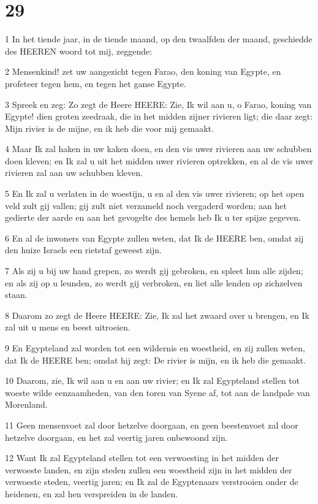 \chapter{29}

\par 1 In het tiende jaar, in de tiende maand, op den twaalfden der maand, geschiedde des HEEREN woord tot mij, zeggende:
\par 2 Mensenkind! zet uw aangezicht tegen Farao, den koning van Egypte, en profeteer tegen hem, en tegen het ganse Egypte.
\par 3 Spreek en zeg: Zo zegt de Heere HEERE: Zie, Ik wil aan u, o Farao, koning van Egypte! dien groten zeedraak, die in het midden zijner rivieren ligt; die daar zegt: Mijn rivier is de mijne, en ik heb die voor mij gemaakt.
\par 4 Maar Ik zal haken in uw kaken doen, en den vis uwer rivieren aan uw schubben doen kleven; en Ik zal u uit het midden uwer rivieren optrekken, en al de vis uwer rivieren zal aan uw schubben kleven.
\par 5 En Ik zal u verlaten in de woestijn, u en al den vis uwer rivieren; op het open veld zult gij vallen; gij zult niet verzameld noch vergaderd worden; aan het gedierte der aarde en aan het gevogelte des hemels heb Ik u ter spijze gegeven.
\par 6 En al de inwoners van Egypte zullen weten, dat Ik de HEERE ben, omdat zij den huize Israels een rietstaf geweest zijn.
\par 7 Als zij u bij uw hand grepen, zo werdt gij gebroken, en spleet hun alle zijden; en als zij op u leunden, zo werdt gij verbroken, en liet alle lenden op zichzelven staan.
\par 8 Daarom zo zegt de Heere HEERE: Zie, Ik zal het zwaard over u brengen, en Ik zal uit u mens en beest uitroeien.
\par 9 En Egypteland zal worden tot een wildernis en woestheid, en zij zullen weten, dat Ik de HEERE ben; omdat hij zegt: De rivier is mijn, en ik heb die gemaakt.
\par 10 Daarom, zie, Ik wil aan u en aan uw rivier; en Ik zal Egypteland stellen tot woeste wilde eenzaamheden, van den toren van Syene af, tot aan de landpale van Morenland.
\par 11 Geen mensenvoet zal door hetzelve doorgaan, en geen beestenvoet zal door hetzelve doorgaan, en het zal veertig jaren onbewoond zijn.
\par 12 Want Ik zal Egypteland stellen tot een verwoesting in het midden der verwoeste landen, en zijn steden zullen een woestheid zijn in het midden der verwoeste steden, veertig jaren; en Ik zal de Egyptenaars verstrooien onder de heidenen, en zal hen verspreiden in de landen.

